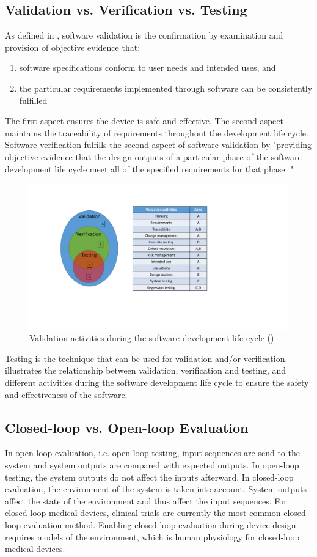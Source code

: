 \subsection{Validation vs. Verification vs. Testing}
As defined in \cite{fda2}, software validation is the confirmation by examination and provision of objective evidence that:
\begin{enumerate}
	\item software specifications conform to user needs and intended uses, and 
	\item the particular requirements implemented through software can be consistently fulfilled
\end{enumerate}
The first aspect ensures the device is safe and effective. 
The second aspect maintains the traceability of requirements throughout the development life cycle.
Software verification fulfills the second aspect of software validation by "providing objective evidence that the design outputs of a particular phase of the software development life cycle meet all of the specified requirements for that phase. "
\begin{figure}[t]
		\centering
		\includegraphics[width=\textwidth]{figs/validation.pdf}
		\caption{Validation activities during the software development life cycle (\cite{Vogel})}
		\label{fig:validation}
\end{figure}

Testing is the technique that can be used for validation and/or verification.  illustrates the relationship between validation, verification and testing, and different activities during the software development life cycle to ensure the safety and effectiveness of the software.
\subsection{Closed-loop vs. Open-loop Evaluation}
In open-loop evaluation, i.e. open-loop testing, input sequences are send to the system and system outputs are compared with expected outputs. 
In open-loop testing, the system outputs do not affect the inputs afterward. 
In closed-loop evaluation, the environment of the system is taken into account. 
System outputs affect the state of the environment and thus affect the input sequences. 
For closed-loop medical devices, clinical trials are currently the most common closed-loop evaluation method. 
Enabling closed-loop evaluation during device design requires models of the environment, which is human physiology for closed-loop medical devices.

